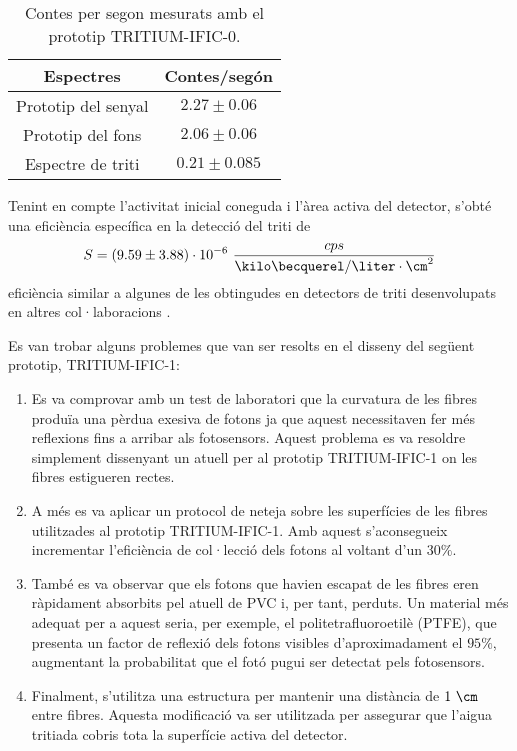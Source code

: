 \begin{table}[htbp]
\centering{}%
\begin{tabular}{cc}
\toprule 
Espectres & Contes/segón \tabularnewline
\midrule
\midrule 
Prototip del senyal & $2.27 \pm 0.06$ \tabularnewline
Prototip del fons & $2.06 \pm 0.06$ \tabularnewline  
Espectre de triti & $0.21 \pm 0.085$ \tabularnewline
\bottomrule
\end{tabular}
\caption{Contes per segon mesurats amb el prototip TRITIUM-IFIC-0.}
\label{tab:ContesPerSegonTRITIUMIFIC0}
\end{table}

Tenint en compte l'activitat inicial coneguda i l'àrea activa del detector, s'obté una eficiència específica en la detecció del triti de
$$S = (9.59 \pm 3.88)\cdot{} 10^{-6}~\frac{cps}{\kilo\becquerel/\liter \cdot{} \cm^{2}}$$
eficiència similar a algunes de les obtingudes en detectors de triti desenvolupats en altres col·laboracions \cite{Muramatsu, Moghissi}.

Es van trobar alguns problemes que van ser resolts en el disseny del següent prototip, TRITIUM-IFIC-1:

\begin{enumerate}
\item{} Es va comprovar amb un test de laboratori que la curvatura de les fibres produïa una pèrdua exesiva de fotons ja que aquest necessitaven fer més reflexions fins a arribar als fotosensors. Aquest problema es va resoldre simplement dissenyant un atuell per al prototip TRITIUM-IFIC-1 on les fibres estigueren rectes.

\item{} A més es va aplicar un protocol de neteja sobre les superfícies de les fibres utilitzades al prototip TRITIUM-IFIC-1. Amb aquest s'aconsegueix incrementar l'eficiència de col·lecció dels fotons al voltant d'un $30\%$.

\item{} També es va observar que els fotons que havien escapat de les fibres eren ràpidament absorbits pel atuell de PVC i, per tant, perduts. Un material més adequat per a aquest seria, per exemple, el politetrafluoroetilè (PTFE), que presenta un factor de reflexió dels fotons visibles d'aproximadament el $95\%$, augmentant la probabilitat que el fotó pugui ser detectat pels fotosensors.

\item{} Finalment, s'utilitza una estructura per mantenir una distància de $1~\cm$ entre fibres. Aquesta modificació va ser utilitzada per assegurar que l'aigua tritiada cobris tota la superfície activa del detector.

\end{enumerate}

